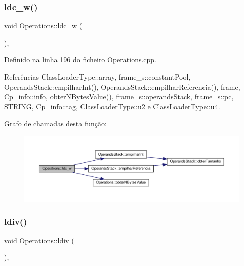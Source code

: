 \subsubsection{\texorpdfstring{ldc\+\_\+w()}{ldc\_w()}}
{\footnotesize\ttfamily void Operations\+::ldc\+\_\+w (\begin{DoxyParamCaption}{ }\end{DoxyParamCaption})\hspace{0.3cm}{\ttfamily [static]}, {\ttfamily [private]}}



Definido na linha 196 do ficheiro Operations.\+cpp.



Referências Class\+Loader\+Type\+::array, frame\+\_\+s\+::constant\+Pool, Operands\+Stack\+::empilhar\+Int(), Operands\+Stack\+::empilhar\+Referencia(), frame, Cp\+\_\+info\+::info, obter\+N\+Bytes\+Value(), frame\+\_\+s\+::operands\+Stack, frame\+\_\+s\+::pc, S\+T\+R\+I\+NG, Cp\+\_\+info\+::tag, Class\+Loader\+Type\+::u2 e Class\+Loader\+Type\+::u4.

Grafo de chamadas desta função\+:\nopagebreak
\begin{figure}[H]
\begin{center}
\leavevmode
\includegraphics[width=350pt]{classOperations_a081fd22827f77e8ce5219275256cc831_cgraph}
\end{center}
\end{figure}
\mbox{\label{classOperations_ab9bb90a9db0433e1d04b0eb9bceea9f4}} 
\subsubsection{\texorpdfstring{ldiv()}{ldiv()}}
{\footnotesize\ttfamily void Operations\+::ldiv (\begin{DoxyParamCaption}{ }\end{DoxyParamCaption})\hspace{0.3cm}{\ttfamily [static]}, {\ttfamily [private]}}



